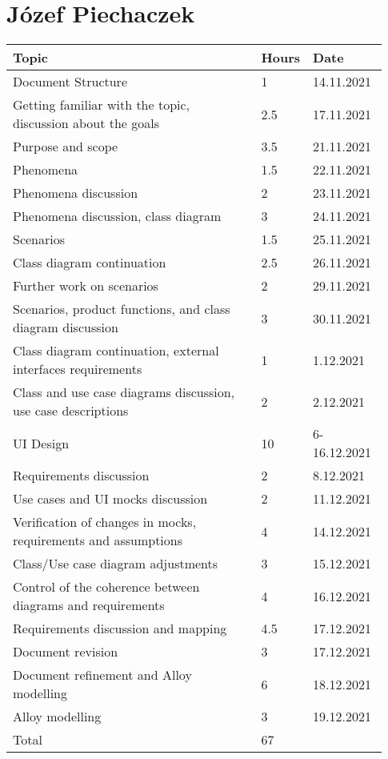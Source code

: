 \section*{Józef Piechaczek}
\begin{longtable}{@{}p{0.67\linewidth} p{0.06\linewidth} p{0.20\linewidth}@{}}
    \toprule[1.5pt]
    Topic &  Hours & Date \\ \hline
    Document Structure & 1 & 14.11.2021 \\ 
    Getting familiar with the topic, discussion about the goals & 2.5 & 17.11.2021 \\ 
    Purpose and scope & 3.5 & 21.11.2021 \\ 
    Phenomena & 1.5 & 22.11.2021 \\ 
    Phenomena discussion & 2 & 23.11.2021 \\
    Phenomena discussion, class diagram & 3 & 24.11.2021 \\ 
    Scenarios & 1.5 & 25.11.2021 \\
    Class diagram continuation & 2.5 & 26.11.2021 \\ 
    Further work on scenarios & 2 & 29.11.2021 \\
    Scenarios, product functions, and class diagram discussion & 3 & 30.11.2021\\ 
    Class diagram continuation, external interfaces requirements & 1 & 1.12.2021\\
    Class and use case diagrams discussion, use case descriptions & 2 & 2.12.2021\\
    UI Design & 10 & 6-16.12.2021\\ 
    Requirements discussion & 2 & 8.12.2021\\
    Use cases and UI mocks discussion & 2 & 11.12.2021\\
    Verification of changes in mocks, requirements and assumptions & 4 & 14.12.2021\\
    Class/Use case diagram adjustments & 3 & 15.12.2021\\
    Control of the coherence between diagrams and requirements & 4 & 16.12.2021\\
    Requirements discussion and mapping & 4.5 & 17.12.2021\\
    Document revision & 3 & 17.12.2021\\
    Document refinement and Alloy modelling & 6 & 18.12.2021\\
    Alloy modelling & 3 & 19.12.2021\\
    \hline
    Total & 67 & \\
    \bottomrule[1.5pt]
\end{longtable}

